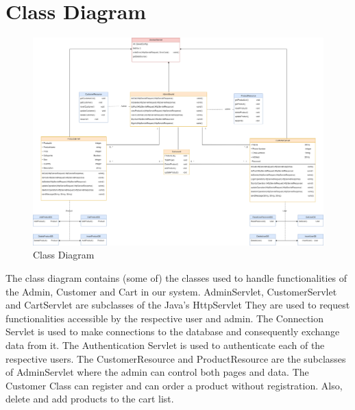 \section{Class Diagram}

\begin{figure}[h]
    \centering
    \includegraphics[width=1\textwidth]{images/ClassDiagram.png}
    \caption{Class Diagram}
    \label{FBPM}
\end{figure}

The class diagram contains (some of) the classes used to handle functionalities of the Admin, Customer and Cart in our system. AdminServlet, CustomerServlet and CartServlet are subclasses of the Java’s HttpServlet They are used to request functionalities accessible by the respective user and admin. The Connection Servlet is used to make connections to the database and consequently exchange data from it. The Authentication Servlet is used to authenticate each of the respective users. \newline
The CustomerResource and ProductResource are the subclasses of AdminServlet where the admin can control both pages and data. \newline
The Customer Class can register and can order a product without registration. Also, delete and add products to the cart list.
